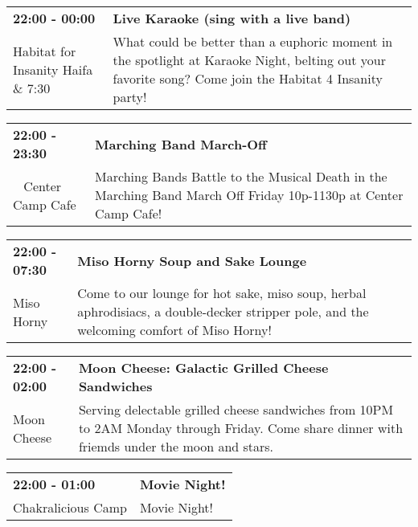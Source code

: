 \begin{tabular}{ p{1in} p{2.2in} }
    \textbf{22:00 - 00:00} & \textbf{Live Karaoke (sing with a live band)} \\
    Habitat for Insanity \newline Haifa \& 7:30 & What could be better than a euphoric moment in the spotlight at Karaoke Night, belting out your favorite song? Come join the Habitat 4 Insanity party! \\
    \hline 
\end{tabular}
    
\begin{tabular}{ p{1in} p{2.2in} }
    \textbf{22:00 - 23:30} & \textbf{Marching Band March-Off} \\
    ~ \newline Center Camp Cafe & Marching Bands Battle to the Musical Death in the Marching Band March Off Friday 10p-1130p at Center Camp Cafe! \\
    \hline 
\end{tabular}
    
\begin{tabular}{ p{1in} p{2.2in} }
    \textbf{22:00 - 07:30} & \textbf{Miso Horny Soup and Sake Lounge} \\
    Miso Horny \newline  & Come to our lounge for hot sake, miso soup, herbal aphrodisiacs, a double-decker stripper pole, and the welcoming comfort of Miso Horny! \\
    \hline 
\end{tabular}
    
\begin{tabular}{ p{1in} p{2.2in} }
    \textbf{22:00 - 02:00} & \textbf{Moon Cheese: Galactic Grilled Cheese Sandwiches} \\
    Moon Cheese \newline  & Serving delectable grilled cheese sandwiches from 10PM to 2AM Monday through Friday. Come share dinner with friemds under the moon and stars. \\
    \hline 
\end{tabular}
    
\begin{tabular}{ p{1in} p{2.2in} }
    \textbf{22:00 - 01:00} & \textbf{Movie Night!} \\
    Chakralicious Camp \newline  & Movie Night! \\
    \hline 
\end{tabular}
    
